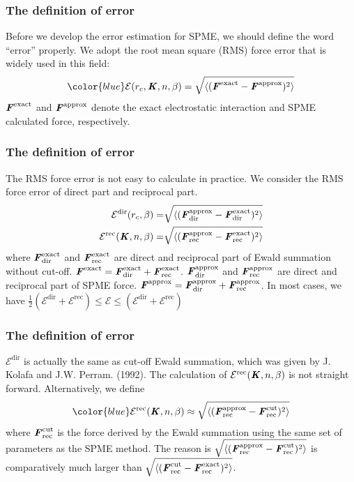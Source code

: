 \documentclass{beamer}
\newcommand{\redc}[1]{{\color{red} #1}}
\newcommand{\bluec}[1]{{\color{blue} #1}}
\renewcommand{\v}[1]{\textbf{\textit{#1}}}
\renewcommand{\d}[1]{\textrm{#1}}
\begin{document}
\begin{frame}
  \frametitle{The definition of error}\vfill
  Before we develop the error estimation for SPME, we should define the word 
  ``error'' properly. 
  \vfill
We adopt the root mean square (RMS) force error that is widely used
in this field: $$ \bluec{\mathcal E(r_c, \v K, n, \beta) = \sqrt{\langle(\v
  F^{\textrm{exact}} - \v F^{\textrm{{approx}}})^2\rangle} }$$
$\v F^{\d {exact}}$ and $\v F^{\d {approx}}$ denote the exact
electrostatic interaction and SPME calculated force, respectively.
\vfill
\end{frame}


\begin{frame}
  \frametitle{The definition of error}\vfill
  The RMS force error is not easy to calculate in practice. 
  We consider the RMS force error of direct part and reciprocal part.
  \bluec{
    \begin{align*}
      \mathcal E^{\textrm{dir}}(r_c, \beta) =& 
      \sqrt{\langle(\v F^{\textrm{{approx}}}_{\textrm{{dir}}} - \v F^{\textrm{exact}}_{\textrm{dir}})^2\rangle} \\
      \mathcal E^{\textrm{rec}}(\v K, n, \beta) = &
      \sqrt{\langle(\v F^{\textrm{{approx}}}_{\textrm{{rec}}} - \v F^{\textrm{exact}}_{\textrm{rec}})^2\rangle}
    \end{align*}}
  where $\v F^{\textrm{exact}}_{\textrm{dir}}$ and
  $\v F^{\textrm{exact}}_{\textrm{rec}}$ are direct and reciprocal part of
  Ewald summation \redc{without} cut-off. \bluec{ $\v F^{\textrm{exact}} =
    \v F^{\textrm{exact}}_{\textrm{dir}} + \v F^{\textrm{exact}}_{\textrm{rec}}
    $}.
  \vfill
  $\v F^{\textrm{approx}}_{\textrm{dir}}$ and $\v
  F^{\textrm{approx}}_{\textrm{rec}}$ are direct and reciprocal part of
  SPME force. \bluec{$\v F^{\textrm{approx}} =
    \v F^{\textrm{approx}}_{\textrm{dir}} + \v F^{\textrm{approx}}_{\textrm{rec}}
    $}.
  \vfill
  In most cases, we have \redc{
  $\frac12(\mathcal E^{\textrm{dir}} + \mathcal E^{\textrm{rec}}) \leq
  \mathcal E \leq (\mathcal E^{\textrm{dir}} +
  \mathcal E^{\textrm{rec}})$}
\end{frame}


\begin{frame}
  \frametitle{The definition of error}\vfill
  $\mathcal E^{\textrm{dir}}$ is actually the same as cut-off Ewald
  summation, which was given by \bluec{J. Kolafa and
    J.W. Perram. (1992)}.
  \vfill
  The calculation of $\mathcal E^{\textrm{rec}}(\v K, n, \beta)$ is not straight forward.
  Alternatively, we define 
  $$ \bluec{\mathcal E^{\textrm{rec}}(\v K, n, \beta) \approx \sqrt{\langle(\v
  F_{\textrm{rec}}^{\textrm{{approx}}} - \v
  F_{\textrm{rec}}^{\textrm{{cut}}})^2\rangle} }$$
where $\v
F_{\textrm{rec}}^{\textrm{{cut}}}$ is the force derived by the Ewald
summation using the same set of parameters as the SPME method. The reason is \redc{
$ \sqrt{\langle(\v
  F_{\textrm{rec}}^{\textrm{{approx}}} - \v
  F_{\textrm{rec}}^{\textrm{{cut}}})^2\rangle} $ is comparatively much
larger than $ \sqrt{\langle(\v F_{\textrm{rec}}^{\textrm{cut}} - \v
  F_{\textrm{rec}}^{\textrm{exact}})^2\rangle} $.} \vfill
\end{frame}
\end{document}
